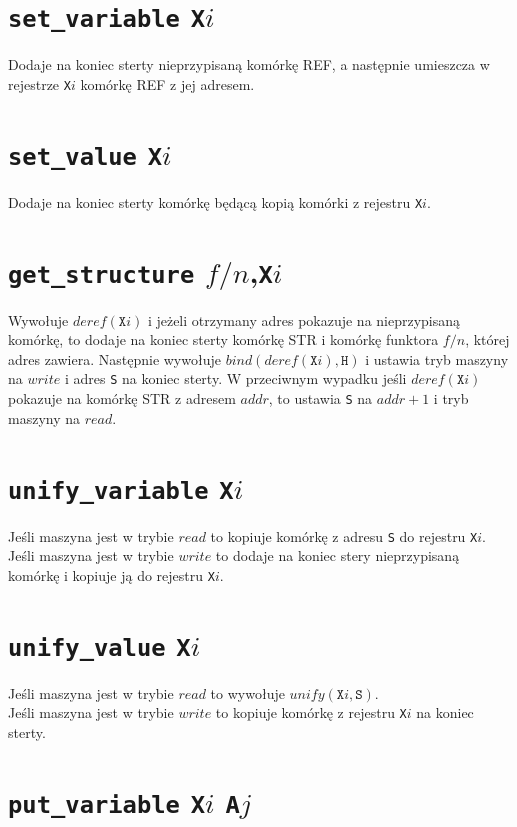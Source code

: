 \section{\texttt{set\_variable} \texttt{X}$i$}

Dodaje na koniec sterty nieprzypisaną komórkę REF, a następnie umieszcza w rejestrze \texttt{X}$i$ komórkę REF z jej adresem.

\section{\texttt{set\_value} \texttt{X}$i$}

Dodaje na koniec sterty komórkę będącą kopią komórki z rejestru \texttt{X}$i$.

\section{\texttt{get\_structure} $f/n$,\texttt{X}$i$}

Wywołuje $deref(\texttt{X}i)$ i jeżeli otrzymany adres pokazuje na nieprzypisaną komórkę, to dodaje na koniec sterty komórkę STR i komórkę funktora $f/n$, której adres zawiera. Następnie wywołuje $bind(deref(\texttt{X}i),\texttt{H})$ i ustawia tryb maszyny na $write$ i adres \texttt{S} na koniec sterty. W przeciwnym wypadku jeśli $deref(\texttt{X}i)$ pokazuje na komórkę STR z adresem $addr$, to ustawia \texttt{S} na $addr+1$ i tryb maszyny na $read$.

\section{\texttt{unify\_variable} \texttt{X}$i$}

Jeśli maszyna jest w trybie $read$ to kopiuje komórkę z adresu \texttt{S} do rejestru \texttt{X}$i$.\\
Jeśli maszyna jest w trybie $write$ to dodaje na koniec stery nieprzypisaną komórkę i kopiuje ją do rejestru \texttt{X}$i$.

\section{\texttt{unify\_value} \texttt{X}$i$}

Jeśli maszyna jest w trybie $read$ to wywołuje $unify(\texttt{X}i, \texttt{S})$.\\
Jeśli maszyna jest w trybie $write$ to kopiuje komórkę z rejestru \texttt{X}$i$ na koniec sterty.

\section{\texttt{put\_variable} \texttt{X}$i$ \texttt{A}$j$}

